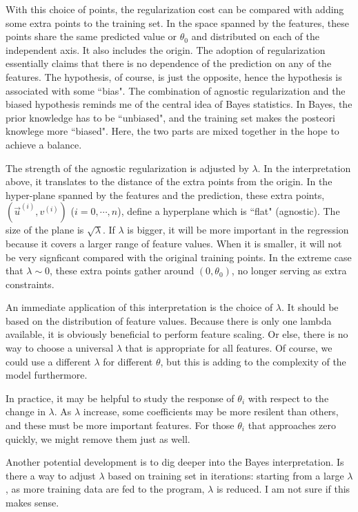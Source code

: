 With this choice of points, the regularization cost can be compared with adding some extra points to the training set. In the space spanned by 
the features, these points share the same predicted value or $\theta_0$ and distributed on each of the independent axis. It also includes the origin. The adoption 
of regularization essentially claims that there is no dependence of the prediction on any of the features. The hypothesis, of course, is just the opposite, hence
the hypothesis is associated with some ``bias". The combination of agnostic regularization and the biased hypothesis reminds me of the central idea of
Bayes statistics. In Bayes, the prior knowledge has to be ``unbiased", and the training set makes the posteori knowlege more ``biased". Here, the
two parts are mixed together in the hope to achieve a balance.

The strength of the agnostic regularization is adjusted by $\lambda$. In the interpretation above, it translates to the distance of the extra points 
from the origin. In the hyper-plane spanned by the features and the prediction, these extra points, $(\vec u^{(i)}, v^{(i)})$ ($i = 0, \cdots, n$), define a 
hyperplane which is ``flat" (agnostic). The size of the plane is $\sqrt\lambda$. If $\lambda$ is bigger, it will be more important in the regression because
it covers a larger range of feature values. When it is smaller, it will not be very signficant compared with the original training points. In the extreme
case that $\lambda\sim0$, these extra points gather around $(0, \theta_0)$, no longer serving as extra constraints.

An immediate application of this interpretation is the choice of $\lambda$. It should be based on the distribution of feature values. Because there is only
one lambda available, it is obviously beneficial to perform feature scaling. Or else, there is no way to choose a universal $\lambda$ that is appropriate 
for all features. Of course, we could use a different $\lambda$ for different $\theta$, but this is adding to the complexity of the model furthermore. 

In practice, it may be helpful to study the response of $\theta_i$ with respect to the change in $\lambda$. As $\lambda$ increase, some coefficients may 
be more resilent than others, and these must be more important features. For those $\theta_i$ that approaches zero quickly, we might 
remove them just as well.


Another potential development is to dig deeper into the Bayes interpretation. Is there a way to adjust $\lambda$ based on training set
in iterations: starting from a large $\lambda$, as more training data are fed to the program, $\lambda$ is reduced. I am not sure if this makes sense.


